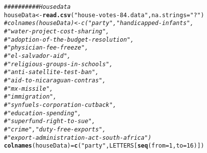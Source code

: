 \documentclass{article}\usepackage[]{graphicx}\usepackage[]{color}
\makeatletter
\newcommand{\hlnum}[1]{\textcolor[rgb]{0.686,0.059,0.569}{#1}}%
\newcommand{\hlstr}[1]{\textcolor[rgb]{0.192,0.494,0.8}{#1}}%
\newcommand{\hlcom}[1]{\textcolor[rgb]{0.678,0.584,0.686}{\textit{#1}}}%
\newcommand{\hlstd}[1]{\textcolor[rgb]{0.345,0.345,0.345}{#1}}%
\newcommand{\hlkwb}[1]{\textcolor[rgb]{0.69,0.353,0.396}{#1}}%
\newcommand{\hlkwc}[1]{\textcolor[rgb]{0.333,0.667,0.333}{#1}}%
\newcommand{\hlkwd}[1]{\textcolor[rgb]{0.737,0.353,0.396}{\textbf{#1}}}%
\newenvironment{kframe}{%
 \def\at@end@of@kframe{}%
 \ifinner\ifhmode%
  \def\at@end@of@kframe{\end{minipage}}%
  \begin{minipage}{\columnwidth}%
 \fi\fi%
 \def\FrameCommand##1{\hskip\@totalleftmargin \hskip-\fboxsep
 \colorbox{shadecolor}{##1}\hskip-\fboxsep
     \hskip-\linewidth \hskip-\@totalleftmargin \hskip\columnwidth}%
 \MakeFramed {\advance\hsize-\width
   \@totalleftmargin\z@ \linewidth\hsize
   \@setminipage}}%
 {\par\unskip\endMakeFramed%
 \at@end@of@kframe}
\newenvironment{knitrout}{}{} %
\makeatother
\begin{document}
\begin{enumerate}
\begin{knitrout}
\begin{kframe}
{\ttfamily\noindent\bfseries\color{errorcolor}{\#\# Error in NB(formula, data, query): Query needs to be a vector}}\begin{alltt}
\hlcom{##########House data}
\hlstd{houseData} \hlkwb{<-} \hlkwd{read.csv}\hlstd{(}\hlstr{"house-votes-84.data"}\hlstd{,}\hlkwc{na.strings}\hlstd{=}\hlstr{"?"}\hlstd{)}
\hlcom{# colnames(houseData) <- c("party", "handicapped-infants",}
\hlcom{#                          "water-project-cost-sharing",}
\hlcom{#                          "adoption-of-the-budget-resolution",}
\hlcom{#                          "physician-fee-freeze",}
\hlcom{#                          "el-salvador-aid",}
\hlcom{#                          "religious-groups-in-schools",}
\hlcom{#                          "anti-satellite-test-ban",}
\hlcom{#                          "aid-to-nicaraguan-contras",}
\hlcom{#                          "mx-missile",}
\hlcom{#                          "immigration",}
\hlcom{#                          "synfuels-corporation-cutback",}
\hlcom{#                          "education-spending",}
\hlcom{#                          "superfund-right-to-sue",}
\hlcom{#                          "crime", "duty-free-exports",}
\hlcom{#                          "export-administration-act-south-africa")}
\hlkwd{colnames}\hlstd{(houseData)} \hlkwb{=} \hlkwd{c}\hlstd{(}\hlstr{"party"}\hlstd{, LETTERS[}\hlkwd{seq}\hlstd{(} \hlkwc{from} \hlstd{=} \hlnum{1}\hlstd{,} \hlkwc{to} \hlstd{=} \hlnum{16} \hlstd{)])}


\end{alltt}
\end{kframe}
\end{knitrout}
\end{enumerate}
\end{document}
